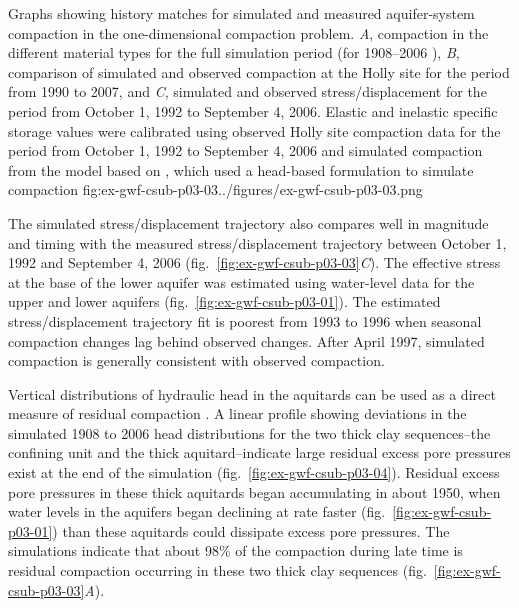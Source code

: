 \begin{StandardFigure}{
                                      Graphs showing history matches for simulated and measured aquifer-system 
                                      compaction in the one-dimensional compaction problem. \textit{A}, compaction 
                                      in the different material types for the full simulation period (for 1908--2006 ), 
                                      \textit{B}, comparison of simulated and observed compaction at the Holly site 
                                      for the period from 1990 to 2007, and \textit{C}, simulated and observed 
                                      stress/displacement for the period from October 1, 1992 to September 4, 2006. 
                                      Elastic and inelastic specific storage values were calibrated using observed 
                                      Holly site compaction data for the period from October 1, 1992 to September 4, 
                                      2006 and simulated compaction from the model based on \cite{sneed2008}, 
                                      which used a head-based formulation to simulate compaction
                                     }{fig:ex-gwf-csub-p03-03}{../figures/ex-gwf-csub-p03-03.png}
\end{StandardFigure}        

The simulated stress/displacement trajectory also compares well in magnitude and timing with the measured stress/displacement trajectory between October 1, 1992 and September 4, 2006 (fig.~\ref{fig:ex-gwf-csub-p03-03}\textit{C}). The effective stress at the base of the lower aquifer was estimated using water-level data for the upper and lower aquifers (fig.~\ref{fig:ex-gwf-csub-p03-01}). The estimated stress/displacement trajectory fit is poorest from 1993 to 1996 when seasonal compaction changes lag behind observed changes. After April 1997, simulated compaction is generally consistent with observed compaction.

Vertical distributions of hydraulic head in the aquitards can be used as a direct measure of residual compaction \citep{riley1969analysis, riley1998mechanics}. A linear profile showing deviations in the simulated 1908 to 2006 head distributions for the two thick clay sequences--the confining unit and the thick aquitard--indicate large residual excess pore pressures exist at the end of the simulation (fig.~\ref{fig:ex-gwf-csub-p03-04}). Residual excess pore pressures in these thick aquitards began accumulating in about 1950, when water levels in the aquifers began declining at rate faster (fig.~\ref{fig:ex-gwf-csub-p03-01}) than these aquitards could dissipate excess pore pressures. The simulations indicate that about 98\% of the compaction during late time is residual compaction occurring in these two thick clay sequences (fig.~\ref{fig:ex-gwf-csub-p03-03}\textit{A}).

